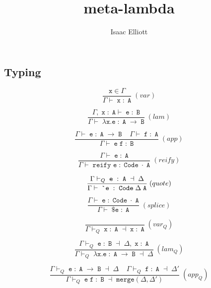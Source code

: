 \documentclass{article}
\title{meta-lambda}
\author{Isaac Elliott}
\begin{document}
\maketitle

\subsection{Typing}

$$
\frac
  {\texttt{x} \in \Gamma}
  {\Gamma \vdash \; \texttt{x} \; : \; \texttt{A} }
  \; (var)
$$

$$
\frac
  {\Gamma, \; \texttt{x} \; : \; \texttt{A} \vdash \; \texttt{e} \; : \; \texttt{B}}
  {\Gamma \vdash \; \lambda \texttt{x.} \texttt{e} \; : \; \texttt{A} \; \rightarrow \; \texttt{B}}
  \; (lam)
$$

$$
\frac
  {
    \Gamma \vdash \; \texttt{e} \; : \; \texttt{A} \; \rightarrow \; \texttt{B}
    \; \; \; \;
    \Gamma \vdash \; \texttt{f} \; : \; \texttt{A}
  }
  {\Gamma \vdash \; \texttt{e} \; \texttt{f} \; : \; \texttt{B}}
  \; (app)
$$

$$
\frac
  {\Gamma \vdash \; \texttt{e} \; : \; \texttt{A}}
  {\Gamma \vdash \; \texttt{reify e} \; : \; \texttt{Code} \; \cdot \; \texttt{A}}
  \; (reify)
$$

$$
\frac
  {\Gamma \vdash_{Q} \; \texttt{e} \; : \; \texttt{A} \; \dashv \; \Delta}
  {\Gamma \vdash \; \texttt{\textasciigrave e} \; : \; \texttt{Code} \; \Delta \; \texttt{A}}
  \; (quote)
$$

$$
\frac
  {\Gamma \vdash \; \texttt{e} \; : \; \texttt{Code} \; \cdot \; \texttt{A}}
  {\Gamma \vdash \; \texttt{\$} \texttt{e} \; : \; \texttt{A}}
  \; (splice)
$$

$$
\frac
  {}
  {\Gamma \vdash_{Q} \; \texttt{x} \; : \; \texttt{A} \; \dashv \; \texttt{x} \; : \; \texttt{A}}
  \; (var_Q)
$$

$$
\frac
    {\Gamma \vdash_{Q} \; \texttt{e} \; : \; \texttt{B} \; \dashv \; \Delta, \; \texttt{x} \; : \; \texttt{A}}
    {\Gamma \vdash_{Q} \; \lambda \texttt{x.} \texttt{e} \; : \; \texttt{A} \; \rightarrow \; \texttt{B} \; \dashv \; \Delta}
    \; (lam_Q)
$$

$$
\frac
    {
      \Gamma \vdash_{Q} \; \texttt{e} \; : \; \texttt{A} \; \rightarrow \; \texttt{B} \; \dashv \; \Delta
      \; \; \; \;
      \Gamma \vdash_{Q} \; \texttt{f} \; : \; \texttt{A} \; \dashv \; \Delta'
    }
    {\Gamma \vdash_{Q} \; \texttt{e} \; \texttt{f} \; : \; \texttt{B} \; \dashv \; \texttt{merge}(\Delta, \Delta')}
    \; (app_Q)
$$
\end{document}

